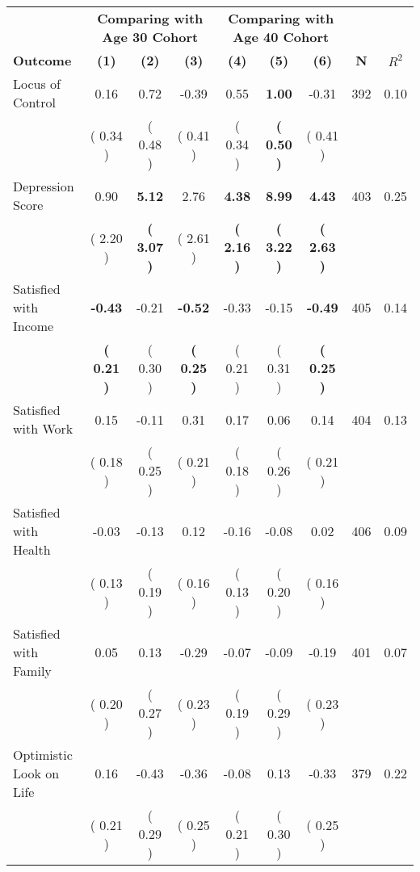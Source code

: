 \begin{tabular}{lcccccccc}
\toprule
 & \multicolumn{3}{c}{\textbf{Comparing with Age 30 Cohort}} & \multicolumn{3}{c}{\textbf{Comparing with Age 40 Cohort}} & \\
\cmidrule(lr){2-4} \cmidrule(lr){5-7} 
 \textbf{Outcome} & \textbf{(1)} & \textbf{(2)} & \textbf{(3)} & \textbf{(4)} & \textbf{(5)} & \textbf{(6)} & \textbf{N} & \textbf{$ R^2$} \\
\midrule
Locus of Control &      0.16 &      0.72 &     -0.39 &      0.55 & \textbf{     1.00} &     -0.31 & 392 &       0.10 \\ 
 & (     0.34 ) & (     0.48 ) & (     0.41 ) & (     0.34 ) & \textbf{(     0.50 )} & (     0.41 ) & \\
Depression Score &      0.90 & \textbf{     5.12} &      2.76 & \textbf{     4.38} & \textbf{     8.99} & \textbf{     4.43} & 403 &       0.25 \\ 
 & (     2.20 ) & \textbf{(     3.07 )} & (     2.61 ) & \textbf{(     2.16 )} & \textbf{(     3.22 )} & \textbf{(     2.63 )} & \\
Satisfied with Income & \textbf{    -0.43} &     -0.21 & \textbf{    -0.52} &     -0.33 &     -0.15 & \textbf{    -0.49} & 405 &       0.14 \\ 
 & \textbf{(     0.21 )} & (     0.30 ) & \textbf{(     0.25 )} & (     0.21 ) & (     0.31 ) & \textbf{(     0.25 )} & \\
Satisfied with Work &      0.15 &     -0.11 &      0.31 &      0.17 &      0.06 &      0.14 & 404 &       0.13 \\ 
 & (     0.18 ) & (     0.25 ) & (     0.21 ) & (     0.18 ) & (     0.26 ) & (     0.21 ) & \\
Satisfied with Health &     -0.03 &     -0.13 &      0.12 &     -0.16 &     -0.08 &      0.02 & 406 &       0.09 \\ 
 & (     0.13 ) & (     0.19 ) & (     0.16 ) & (     0.13 ) & (     0.20 ) & (     0.16 ) & \\
Satisfied with Family &      0.05 &      0.13 &     -0.29 &     -0.07 &     -0.09 &     -0.19 & 401 &       0.07 \\ 
 & (     0.20 ) & (     0.27 ) & (     0.23 ) & (     0.19 ) & (     0.29 ) & (     0.23 ) & \\
Optimistic Look on Life &      0.16 &     -0.43 &     -0.36 &     -0.08 &      0.13 &     -0.33 & 379 &       0.22 \\ 
 & (     0.21 ) & (     0.29 ) & (     0.25 ) & (     0.21 ) & (     0.30 ) & (     0.25 ) & \\

\end{tabular}
